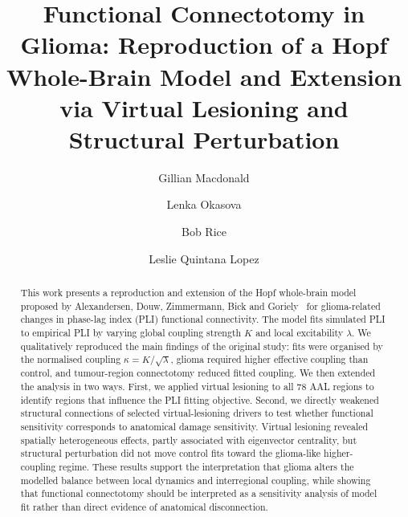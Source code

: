 \documentclass[11pt, reprint, aps, prl, floatfix, secnumarabic]{revtex4-2}
\begin{document}
\setcounter{secnumdepth}{4}
\renewcommand{\thesection}{\arabic{section}}
\renewcommand{\thesubsection}{\thesection.\arabic{subsection}}
\makeatletter
\renewcommand{\section}{%
  \@startsection{section}{1}{\z@}%
    {0.45cm \@plus 0.5ex \@minus 0.2ex}%
    {0.25cm}%
    {\normalfont\small\bfseries}%
}
\renewcommand{\subsection}{%
  \@startsection{subsection}{2}{\z@}%
    {0.35cm \@plus 0.5ex \@minus 0.2ex}%
    {0.18cm}%
    {\normalfont\small\bfseries}%
}
\makeatother

\title{Functional Connectotomy in Glioma: Reproduction of a Hopf Whole-Brain Model and Extension via Virtual Lesioning and Structural Perturbation}
\author{Gillian Macdonald}
\author{Lenka Okasova}
\author{Bob Rice}
\author{Leslie Quintana Lopez}

\begin{abstract}
\noindent This work presents a reproduction and extension of the Hopf whole-brain model proposed by Alexandersen, Douw, Zimmermann, Bick and Goriely~\cite{Alexandersen2025} for glioma-related changes in phase-lag index (PLI) functional connectivity. The model fits simulated PLI to empirical PLI by varying global coupling strength \(K\) and local excitability \(\lambda\). We qualitatively reproduced the main findings of the original study: fits were organised by the normalised coupling \(\kappa = K/\sqrt{\lambda}\), glioma required higher effective coupling than control, and tumour-region connectotomy reduced fitted coupling.
We then extended the analysis in two ways. First, we applied virtual lesioning to all 78 AAL regions to identify regions that influence the PLI fitting objective. Second, we directly weakened structural connections of selected virtual-lesioning drivers to test whether functional sensitivity corresponds to anatomical damage sensitivity. Virtual lesioning revealed spatially heterogeneous effects, partly associated with eigenvector centrality, but structural perturbation did not move control fits toward the glioma-like higher-coupling regime.
These results support the interpretation that glioma alters the modelled balance between local dynamics and interregional coupling, while showing that functional connectotomy should be interpreted as a sensitivity analysis of model fit rather than direct evidence of anatomical disconnection.
\end{abstract}
\end{document}
